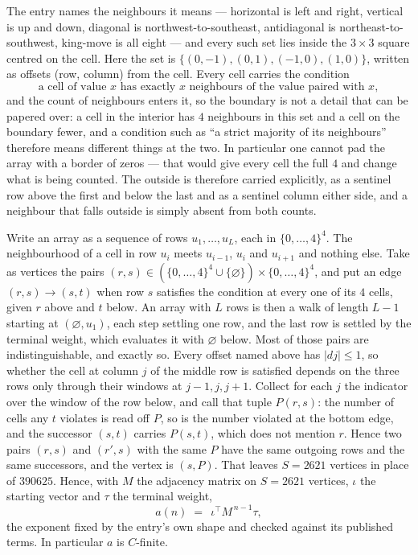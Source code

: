 \documentclass[11pt,a4paper]{article}
\theoremstyle{plain}
\theoremstyle{definition}
\begin{document}
The entry names the neighbours it means --- horizontal is left and right, vertical is up and
down, diagonal is northwest-to-southeast, antidiagonal is northeast-to-southwest, king-move is
all eight --- and every such set lies inside the $3\times3$ square centred on the cell. Here
the set is $\{(0,-1), (0,1), (-1,0), (1,0)\}$, written as offsets (row, column) from the cell. Every cell carries
the condition
\[
\text{a cell of value }x\text{ has exactly }x\text{ neighbours of the value paired with }x,
\]
and the count of neighbours enters it, so the boundary is not a detail that can be papered
over: a cell in the interior has $4$ neighbours in this set and a cell on the boundary
fewer, and a condition such as ``a strict majority of its neighbours'' therefore means
different things at the two. In particular one cannot pad the array with a border of zeros ---
that would give every cell the full $4$ and change what is being counted. The outside is
therefore carried
explicitly, as a sentinel row above the first and below the last and as a sentinel column
either side, and a neighbour that falls outside is simply absent from both counts.

Write an array as a sequence of rows $u_1,\dots,u_L$, each in
$\{0,\dots,4\}^{4}$. The neighbourhood of a cell in row $u_i$ meets $u_{i-1}$,
$u_i$ and $u_{i+1}$ and nothing else. Take as vertices the pairs
$(r,s)\in(\{0,\dots,4\}^{4}\cup\{\varnothing\})\times\{0,\dots,4\}^{4}$,
and put an edge $(r,s)\to(s,t)$ when row $s$ satisfies the condition at every one of its
$4$ cells, given $r$ above and $t$ below. An array with $L$ rows is then a walk of length
$L-1$ starting at $(\varnothing,u_1)$, each step settling one row, and the last row is
settled by the terminal weight, which evaluates it with $\varnothing$ below. Most of those pairs are indistinguishable, and exactly so. Every offset named above has $|dj|\le 1$, so whether the cell at column $j$ of the middle row is satisfied depends on the three rows only through their windows at $j-1,j,j+1$. Collect for each $j$ the indicator over the window of the row below, and call that tuple $P(r,s)$: the number of cells any $t$ violates is read off $P$, so is the number violated at the bottom edge, and the successor $(s,t)$ carries $P(s,t)$, which does not mention $r$. Hence two pairs $(r,s)$ and $(r',s)$ with the same $P$ have the same outgoing rows and the same successors, and the vertex is $(s,P)$. That leaves $S=2621$ vertices in place of $390625$. Hence,
with $M$ the adjacency matrix on $S=2621$ vertices, $\iota$ the starting vector and $\tau$ the
terminal weight,
\[
a(n)\;=\;\,\iota^{\!\top}M^{\,n-1}\tau ,
\]
the exponent fixed by the entry's own shape and checked against its published terms. In
particular $a$ is $C$-finite.
\end{document}
